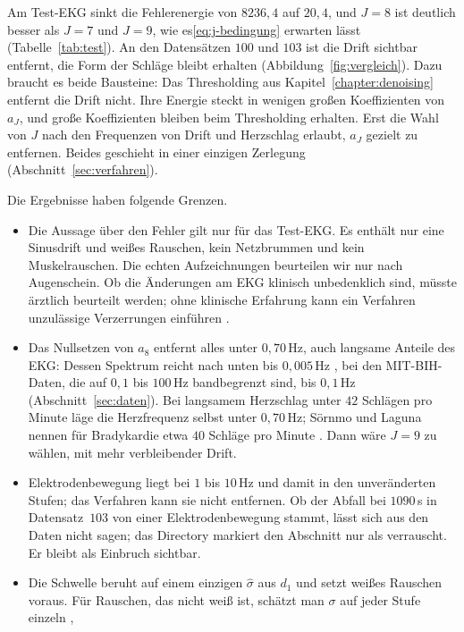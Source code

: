 \documentclass[a4paper,11pt,bibliography=totoc,listof=totoc,headinclude=true,cleardoublepage=empty,oneside]{scrbook}
\theoremstyle{plain}
\theoremstyle{definition}
\begin{document}
Am Test-EKG sinkt die Fehlerenergie von $8236{,}4$ auf $20{,}4$, und $J = 8$ ist 
deutlich besser als $J = 7$ und $J = 9$, wie es\eqref{eq:j-bedingung} erwarten lässt 
(Tabelle~\ref{tab:test}). An den
Datensätzen $100$ und $103$ ist die Drift sichtbar entfernt, die Form der
Schläge bleibt erhalten (Abbildung~\ref{fig:vergleich}). Dazu braucht es beide
Bausteine: Das Thresholding aus Kapitel~\ref{chapter:denoising} entfernt die Drift
nicht. Ihre Energie steckt in wenigen gro\ss en Koeffizienten von $a_J$,
und gro\ss e Koeffizienten bleiben beim Thresholding erhalten.
Erst die Wahl von $J$ nach den Frequenzen von Drift und Herzschlag erlaubt, 
$a_J$ gezielt zu entfernen.
Beides geschieht in einer einzigen Zerlegung (Abschnitt~\ref{sec:verfahren}).

Die Ergebnisse haben folgende Grenzen.
\begin{itemize}
\item Die Aussage über den Fehler gilt nur für das Test-EKG. Es enthält nur
  eine Sinusdrift und wei\ss es Rauschen, kein Netzbrummen und kein
  Muskelrauschen. Die echten Aufzeichnungen beurteilen wir nur nach Augenschein.
  Ob die Änderungen am EKG klinisch unbedenklich sind, müsste ärztlich
  beurteilt werden; ohne klinische Erfahrung kann ein Verfahren unzulässige
  Verzerrungen einführen \cite[Kap.~1.4.1]{sornmo}. %
\item Das Nullsetzen von $a_8$ entfernt alles unter $0{,}70$\,Hz, auch
  langsame Anteile des EKG: Dessen Spektrum reicht nach unten bis
  $0{,}005$\,Hz \cite[Kap.~2.4.3.2]{gacek}, %
  bei den MIT-BIH-Daten, die auf $0{,}1$ bis $100$\,Hz bandbegrenzt sind,
  bis $0{,}1$\,Hz (Abschnitt~\ref{sec:daten}).
  Bei langsamem Herzschlag unter $42$ Schlägen pro Minute läge die
  Herzfrequenz selbst unter $0{,}70$\,Hz; Sörnmo und Laguna nennen für
  Bradykardie etwa $40$ Schläge pro Minute \cite[Kap.~7.1]{sornmo}. %
  Dann wäre $J = 9$ zu wählen, mit mehr verbleibender Drift.
\item Elektrodenbewegung liegt bei $1$ bis $10$\,Hz und damit in den
  unveränderten Stufen; das Verfahren kann sie nicht entfernen. Ob der Abfall
  bei $1090$\,s in Datensatz~$103$ von einer Elektrodenbewegung stammt, lässt
  sich aus den Daten nicht sagen; das Directory markiert den Abschnitt nur als
  verrauscht. Er bleibt als Einbruch sichtbar.
\item Die Schwelle beruht auf einem einzigen $\hat\sigma$ aus $d_1$ und setzt
  wei\ss es Rauschen voraus. Für Rauschen, das nicht wei\ss{} ist, schätzt man
  $\sigma$ auf jeder Stufe einzeln \cite[Kap.~15.2.2]{alessio}, %

\end{itemize}
\end{document}
